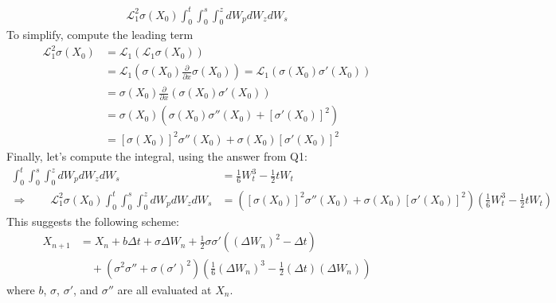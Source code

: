\documentclass[12pt]{article}
\theoremstyle{plain}
\theoremstyle{definition}
\theoremstyle{remark}
\begin{document}
\begin{enumerate}
\begin{align*}
        \mathscr{L}^2_1\sigma(X_0) \int^t_0\int^s_0 \int^z_0 dW_p dW_z dW_s
    \end{align*}
    To simplify, compute the leading term
    \begin{align*}
      \mathscr{L}^2_1\sigma(X_0)
      &=
      \mathscr{L}_1\left(\mathscr{L}_1\sigma(X_0)\right) \\
      &=
      \mathscr{L}_1\left(
        \sigma(X_0)
        \frac{\partial}{\partial x}\sigma(X_0)
      \right)
      = \mathscr{L}_1 \left( \sigma(X_0) \sigma'(X_0) \right) \\
      &=
      \sigma(X_0)
        \frac{\partial}{\partial x}
      \left( \sigma(X_0) \sigma'(X_0) \right) \\
      &=
      \sigma(X_0)
      \left(
        \sigma(X_0) \sigma''(X_0)
        + \left[\sigma'(X_0)\right]^2
      \right) \\
      &=
        [\sigma(X_0)]^2 \sigma''(X_0)
        + \sigma(X_0)\left[\sigma'(X_0)\right]^2
    \end{align*}
    Finally, let's compute the integral, using the answer from Q1:
    \begin{align*}
        \int^t_0\int^s_0 \int^z_0 dW_p dW_z dW_s
        &= \frac{1}{6}W_t^3 - \frac{1}{2} t W_t \\
      \Rightarrow \qquad
        \mathscr{L}^2_1\sigma(X_0)
        \int^t_0\int^s_0 \int^z_0 dW_p dW_z dW_s
        &= \left( [\sigma(X_0)]^2 \sigma''(X_0)
        + \sigma(X_0)\left[\sigma'(X_0)\right]^2\right)
          \left(
          \frac{1}{6}W_t^3 - \frac{1}{2} t W_t\right)
    \end{align*}
    This suggests the following scheme:
    \begin{align*}
      X_{n+1}
        &= X_n
        + b\Delta t + \sigma \Delta W_n
        + \frac{1}{2}\sigma\sigma' ( (\Delta W_n)^2 - \Delta t)\\
      &\quad+ \left(\sigma^2\sigma'' +\sigma(\sigma')^2\right)
        \left(\frac{1}{6} (\Delta W_n)^3 -\frac{1}{2}(\Delta t)(\Delta W_n)
        \right)
    \end{align*}
    where $b$, $\sigma$, $\sigma'$, and $\sigma''$ are all evaluated at
    $X_n$.



\end{enumerate}
\end{document}
